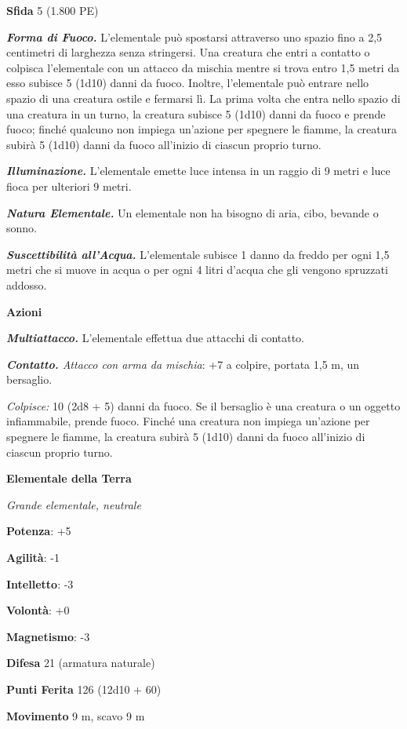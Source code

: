 \begin{multicols}{2}
\textbf{Sfida} 5 (1.800 PE)

\emph{\textbf{Forma di Fuoco.}} L'elementale può spostarsi attraverso
uno spazio fino a 2,5 centimetri di larghezza senza stringersi. Una
creatura che entri a contatto o colpisca l'elementale con un attacco da
mischia mentre si trova entro 1,5 metri da esso subisce 5 (1d10) danni
da fuoco. Inoltre, l'elementale può entrare nello spazio di una creatura
ostile e fermarsi lì. La prima volta che entra nello spazio di una
creatura in un turno, la creatura subisce 5 (1d10) danni da fuoco e
prende fuoco; finché qualcuno non impiega un'azione per spegnere le
fiamme, la creatura subirà 5 (1d10) danni da fuoco all'inizio di ciascun
proprio turno.

\emph{\textbf{Illuminazione.}} L'elementale emette luce intensa in un
raggio di 9 metri e luce fioca per ulteriori 9 metri.

\emph{\textbf{Natura Elementale.}} Un elementale non ha bisogno di aria,
cibo, bevande o sonno.

\emph{\textbf{Suscettibilità all'Acqua.}} L'elementale subisce 1 danno
da freddo per ogni 1,5 metri che si muove in acqua o per ogni 4 litri
d'acqua che gli vengono spruzzati addosso.

\textbf{Azioni}

\emph{\textbf{Multiattacco.}} L'elementale effettua due attacchi di
contatto.

\emph{\textbf{Contatto.} Attacco con arma da mischia}: +7 a colpire,
portata 1,5 m, un bersaglio.

\emph{Colpisce:} 10 (2d8 + 5) danni da fuoco. Se il bersaglio è una
creatura o un oggetto infiammabile, prende fuoco. Finché una creatura
non impiega un'azione per spegnere le fiamme, la creatura subirà 5
(1d10) danni da fuoco all'inizio di ciascun proprio turno.

\textbf{Elementale della Terra}

\emph{Grande elementale, neutrale}

\textbf{Potenza}: +5

\textbf{Agilità}: -1

\textbf{Intelletto}: -3

\textbf{Volontà}: +0

\textbf{Magnetismo}: -3

\textbf{Difesa} 21 (armatura naturale)

\textbf{Punti Ferita} 126 (12d10 + 60)

\textbf{Movimento} 9 m, scavo 9 m


\end{multicols}
